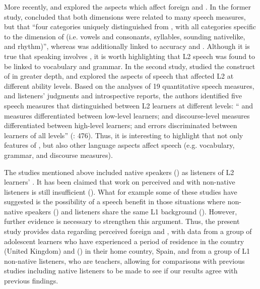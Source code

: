 \documentclass[output=paper]{langsci/langscibook}
\begin{document}
More recently, \citet{TrofimovichIsaacs2012} and \citet{IsaacsTrofimovich2012} explored the  aspects which affect foreign  and . In the former study, \citet{TrofimovichIsaacs2012} concluded that both dimensions were related to many speech measures, but that “four categories uniquely distinguished  from , with all categories specific to the dimension of  (i.e. vowels and consonants, syllables, sounding nativelike, and rhythm)”, whereas  was additionally linked to  accuracy and . Although it is true that speaking involves , it is worth highlighting that {L2} speech  was found to be linked to vocabulary and grammar. In the second study, \citet{IsaacsTrofimovich2012} studied the construct of  in greater depth, and explored the aspects of speech that affected {L2}  at different ability levels. Based on the analyses of 19 quantitative speech measures, and listeners’ judgments and introspective reports, the authors identified five speech measures that distinguished between {L2} learners at different  levels: “ and  measures differentiated between low-level learners;  and discourse-level measures differentiated between high-level learners; and  errors discriminated between learners of all levels” (\citealt{IsaacsTrofimovich2012}: 476). Thus, it is interesting to highlight that not only  features of , but also other language aspects affect speech  (e.g. vocabulary, grammar, and discourse measures). 

The studies mentioned above included  native speakers () as listeners of {L2} learners’ . It has been claimed that work on perceived  and  with non-native listeners is still insufficient (\citealt{DerwingMunro2011,IsaacsTrofimovich2012}). What for example some of these studies have suggested is the possibility of a speech  benefit in those situations where non-native speakers () and listeners share the same {L1} background (\citealt{GallardodelPuertoEtAl2007}). However, further evidence is necessary to strengthen this argument. Thus, the present study provides data regarding perceived foreign  and , with data from a group of adolescent  learners who have experienced a period of residence in the  country (United Kingdom) and  () in their home country, Spain, and from a group of  {L1} non-native listeners, who are  teachers, allowing for comparisons with previous studies including native listeners to be made to see if our results agree with previous findings. 
\end{document}
